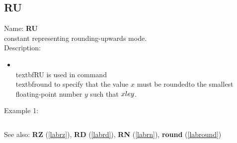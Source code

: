 \subsection{RU}
\label{labru}
\noindent Name: \textbf{RU}\\
constant representing rounding-upwards mode.\\
\noindent Description: \begin{itemize}

\item \\textbf{RU} is used in command \\textbf{round} to specify that the value $x$ must be rounded\n   to the smallest floating-point number $y$ such that $x \\le y$.\n\end{itemize}
\noindent Example 1: 
\begin{center}\begin{minipage}{15cm}\begin{Verbatim}[frame=single]
\end{Verbatim}
\end{minipage}\end{center}
See also: \textbf{RZ} (\ref{labrz}), \textbf{RD} (\ref{labrd}), \textbf{RN} (\ref{labrn}), \textbf{round} (\ref{labround})
